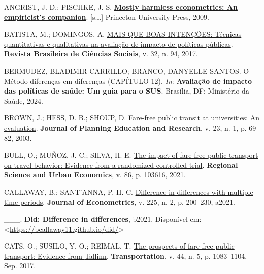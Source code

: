 \documentclass[12pt, a4paper, twoside]{article}
\numberwithin{equation}{subsection} %
\newlength{\cslhangindent}
\newlength{\cslentryspacingunit} %
\newenvironment{CSLReferences}[2] %
 {%
  \setlength{\parindent}{0pt}
  \ifodd #1
  \let\oldpar\par
  \def\par{\hangindent=\cslhangindent\oldpar}
  \fi
  \setlength{\parskip}{#2\cslentryspacingunit}
 }%
 {}
\begin{document}
\hypertarget{refs}{}
\begin{CSLReferences}{0}{0}
\leavevmode{}%
ANGRIST, J. D.; PISCHKE, J.-S.
\textbf{\href{http://www.jstor.org/stable/j.ctvcm4j72}{Mostly harmless
econometrics: An empiricist's companion}}. {[}s.l.{]} Princeton
University Press, 2009.

\leavevmode{}%
BATISTA, M.; DOMINGOS, A.
\href{https://doi.org/10.17666/329414/2017}{MAIS QUE BOAS INTENÇÕES:
Técnicas quantitativas e qualitativas na avaliação de impacto de
políticas públicas}. \textbf{Revista Brasileira de Ciências Sociais}, v.
32, n. 94, 2017.

\leavevmode{}%
BERMUDEZ, BLADIMIR CARRILLO; BRANCO, DANYELLE SANTOS. O {Método}
diferenças-em-diferenças ({CAPÍTULO} 12). \emph{In}: \textbf{Avaliação
de impacto das políticas de saúde: Um guia para o {SUS}}. Brasília, DF:
Ministério da Saúde, 2024.

\leavevmode{}%
BROWN, J.; HESS, D. B.; SHOUP, D.
\href{https://doi.org/10.1177/0739456X03255430}{Fare-free public transit
at universities: An evaluation}. \textbf{Journal of Planning Education
and Research}, v. 23, n. 1, p. 69--82, 2003.

\leavevmode{}%
BULL, O.; MUÑOZ, J. C.; SILVA, H. E.
\href{https://doi.org/10.1016/j.regsciurbeco.2020.103616}{The impact of
fare-free public transport on travel behavior: Evidence from a
randomized controlled trial}. \textbf{Regional Science and Urban
Economics}, v. 86, p. 103616, 2021.

\leavevmode{}%
CALLAWAY, B.; SANT'ANNA, P. H. C.
\href{https://doi.org/10.1016/j.jeconom.2020.12.001}{Difference-in-differences
with multiple time periods}. \textbf{Journal of Econometrics}, v. 225,
n. 2, p. 200--230, a2021.

\leavevmode{}%
\_\_\_. \textbf{Did: Difference in differences}, b2021. Disponível em:
\textless{}\url{https://bcallaway11.github.io/did/}\textgreater{}

\leavevmode{}%
CATS, O.; SUSILO, Y. O.; REIMAL, T.
\href{https://doi.org/10.1007/s11116-016-9695-5}{The prospects of
fare-free public transport: Evidence from {Tallinn}}.
\textbf{Transportation}, v. 44, n. 5, p. 1083--1104, Sep. 2017.


\end{CSLReferences}
\end{document}
